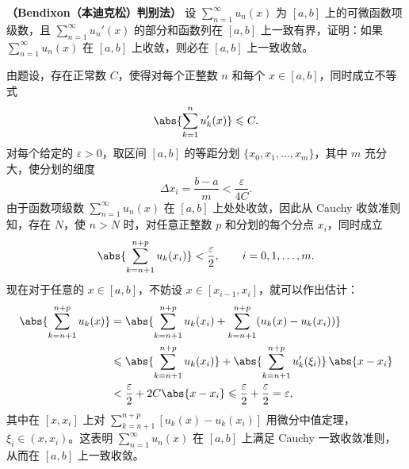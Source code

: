 \begin{xexample}[14.1.4]
\textbf{（Bendixon（本迪克松）判别法）} 设 $\displaystyle\sum_{n=1}^{\infty}u_n(x)$ 为 $[a,b]$ 上的可微函数项级数，且 $\displaystyle\sum_{n=1}^{\infty}u_n'(x)$ 的部分和函数列在 $[a,b]$ 上一致有界，证明：如果 $\displaystyle\sum_{n=1}^{\infty}u_n(x)$ 在 $[a,b]$ 上收敛，则必在 $[a,b]$ 上一致收敛。
\end{xexample}
\begin{xproof}
由题设，存在正常数 $C$，使得对每个正整数 $n$ 和每个 $x\in[a,b]$，同时成立不等式
\[
  \abs{\sum_{k=1}^{n}u_k'(x)}\leqslant C.
\]
对每个给定的 $\varepsilon>0$，取区间 $[a,b]$ 的等距分划 $\{x_0,x_1,\ldots,x_m\}$，其中 $m$ 充分大，使分划的细度
\[
  \Delta x_i=\frac{b-a}{m}<\frac{\varepsilon}{4C}.
\]
由于函数项级数 $\displaystyle\sum_{n=1}^{\infty}u_n(x)$ 在 $[a,b]$ 上处处收敛，因此从 Cauchy 收敛准则知，存在 $N$，使 $n>N$ 时，对任意正整数 $p$ 和分划的每个分点 $x_i$，同时成立
\[
  \abs{\sum_{k=n+1}^{n+p}u_k(x_i)}<\frac{\varepsilon}{2},\qquad i=0,1,\ldots,m.
\]
现在对于任意的 $x\in[a,b]$，不妨设 $x\in[x_{i-1},x_i]$，就可以作出估计：
\[
\begin{aligned}
  \abs{\sum_{k=n+1}^{n+p}u_k(x)}
  &=\abs{\sum_{k=n+1}^{n+p}u_k(x_i)+\sum_{k=n+1}^{n+p}(u_k(x)-u_k(x_i))}\\
  &\leqslant \abs{\sum_{k=n+1}^{n+p}u_k(x_i)}+\abs{\sum_{k=n+1}^{n+p}u_k'(\xi_i)}\,\abs{x-x_i}\\
  &<\frac{\varepsilon}{2}+2C\abs{x-x_i}\leqslant\frac{\varepsilon}{2}+\frac{\varepsilon}{2}=\varepsilon,
\end{aligned}
\]
其中在 $[x,x_i]$ 上对 $\displaystyle\sum_{k=n+1}^{n+p}[u_k(x)-u_k(x_i)]$ 用微分中值定理，$\xi_i\in(x,x_i)$。这表明 $\displaystyle\sum_{n=1}^{\infty}u_n(x)$ 在 $[a,b]$ 上满足 Cauchy 一致收敛准则，从而在 $[a,b]$ 上一致收敛。
\end{xproof}

